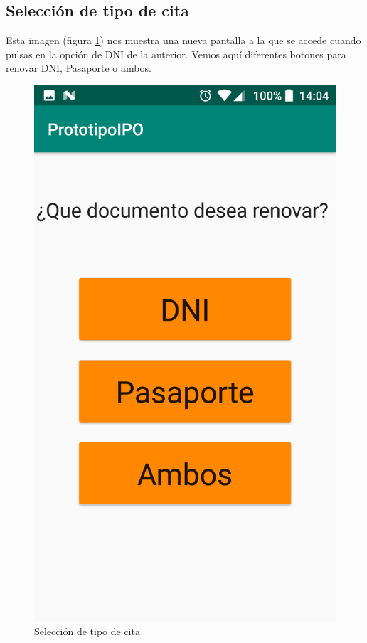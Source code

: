 \documentclass[a4paper,11pt]{article}
\begin{document}
\subsection{Selección de tipo de cita}
Esta imagen (figura \ref{fig:tipocita}) nos muestra una nueva pantalla a la que se accede cuando pulsas en la opción de DNI de la anterior. Vemos aquí diferentes botones para renovar DNI, Pasaporte o ambos.
\begin{figure}[H]
  \centering
  \includegraphics[scale=0.2]{5.png}
  \caption{Selección de tipo de cita}
  \label{fig:tipocita}
\end{figure}
\end{document}
